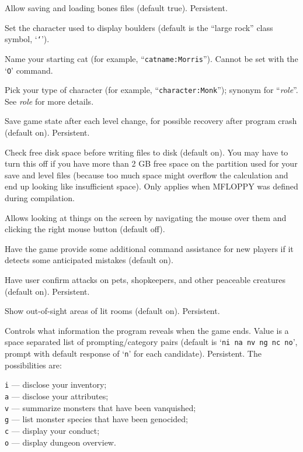 \item[\ib{bones}]
Allow saving and loading bones files (default true).  Persistent.
\item[\ib{boulder}]
Set the character used to display boulders (default is the ``large rock''
class symbol, `{\tt `}').
\item[\ib{catname}]
Name your starting cat (for example, ``{\tt catname:Morris}'').
Cannot be set with the `{\tt O}' command.
\item[\ib{character}]
Pick your type of character (for example, ``{\tt character:Monk}'');
synonym for ``{\it role\/}''.  See {\it role\/} for more details.
\item[\ib{checkpoint}]
Save game state after each level change, for possible recovery after
program crash (default on).  Persistent.
\item[\ib{checkspace}]
Check free disk space before writing files to disk (default on).
You may have to turn this off if you have more than 2 GB free space
on the partition used for your save and level files
(because too much space might overflow the calculation and end up
looking like insufficient space).
Only applies when MFLOPPY was defined during compilation.
\item[\ib{clicklook}]
Allows looking at things on the screen by navigating the mouse
over them and clicking the right mouse button (default off).
\item[\ib{cmdassist}]
Have the game provide some additional command assistance for new
players if it detects some anticipated mistakes (default on).
\item[\ib{confirm}]
Have user confirm attacks on pets, shopkeepers, and other
peaceable creatures (default on).  Persistent.
\item[\ib{dark\verb+_+room}]
Show out-of-sight areas of lit rooms (default on).  Persistent.
\item[\ib{disclose}]
Controls what information the program reveals when the game ends.
Value is a space separated list of prompting/category pairs
(default is `{\tt ni na nv ng nc no}',
prompt with default response of `{\tt n}' for each candidate).
Persistent.
The possibilities are:

{\tt i} --- disclose your inventory;\\
{\tt a} --- disclose your attributes;\\
{\tt v} --- summarize monsters that have been vanquished;\\
{\tt g} --- list monster species that have been genocided;\\
{\tt c} --- display your conduct;\\
{\tt o} --- display dungeon overview.

